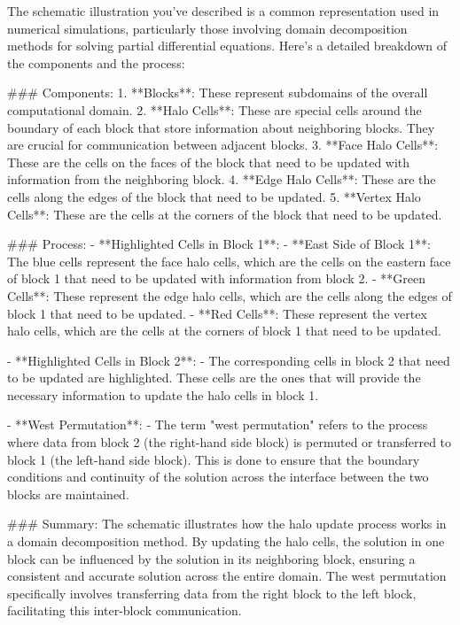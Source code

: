 The schematic illustration you've described is a common representation used in numerical simulations, particularly those involving domain decomposition methods for solving partial differential equations. Here's a detailed breakdown of the components and the process:

### Components:
1. **Blocks**: These represent subdomains of the overall computational domain.
2. **Halo Cells**: These are special cells around the boundary of each block that store information about neighboring blocks. They are crucial for communication between adjacent blocks.
3. **Face Halo Cells**: These are the cells on the faces of the block that need to be updated with information from the neighboring block.
4. **Edge Halo Cells**: These are the cells along the edges of the block that need to be updated.
5. **Vertex Halo Cells**: These are the cells at the corners of the block that need to be updated.

### Process:
- **Highlighted Cells in Block 1**:
  - **East Side of Block 1**: The blue cells represent the face halo cells, which are the cells on the eastern face of block 1 that need to be updated with information from block 2.
  - **Green Cells**: These represent the edge halo cells, which are the cells along the edges of block 1 that need to be updated.
  - **Red Cells**: These represent the vertex halo cells, which are the cells at the corners of block 1 that need to be updated.

- **Highlighted Cells in Block 2**:
  - The corresponding cells in block 2 that need to be updated are highlighted. These cells are the ones that will provide the necessary information to update the halo cells in block 1.

- **West Permutation**:
  - The term "west permutation" refers to the process where data from block 2 (the right-hand side block) is permuted or transferred to block 1 (the left-hand side block). This is done to ensure that the boundary conditions and continuity of the solution across the interface between the two blocks are maintained.

### Summary:
The schematic illustrates how the halo update process works in a domain decomposition method. By updating the halo cells, the solution in one block can be influenced by the solution in its neighboring block, ensuring a consistent and accurate solution across the entire domain. The west permutation specifically involves transferring data from the right block to the left block, facilitating this inter-block communication.